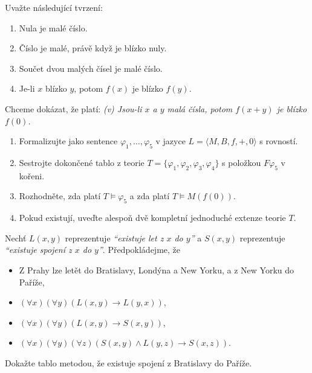 \documentclass[a4paper,12pt]{article}
\begin{document}
\medskip\begin{problem}
Uvažte následující tvrzení:
\begin{enumerate}[label=(\roman*)] \it 
    \item Nula je malé číslo.
    \item Číslo je malé, právě když je blízko nuly.
    \item Součet dvou malých čísel je malé číslo.
    \item Je-li $x$ blízko $y$, potom $f(x)$ je blízko $f(y)$.
\end{enumerate}
Chceme dokázat, že platí: {\it (v) Jsou-li $x$ a $y$ malá čísla, potom $f(x+y)$ je blízko $f(0)$.}

\begin{enumerate}
\item Formalizujte %
jako sentence $\varphi_1,\dots,\varphi_5$ v jazyce $L=\langle M,B,f,+,0\rangle$ s rovností.
\item Sestrojte dokončené tablo z teorie $T=\{\varphi_1,\varphi_2,\varphi_3,\varphi_4\}$ s položkou $F\varphi_5$ v kořeni.
\item Rozhodněte, zda platí $T\models \varphi_5$ a zda platí $T\models M(f(0))$.

\item Pokud existují, uveďte alespoň dvě kompletní jednoduché extenze teorie $T$.
\end{enumerate}
\end{problem}

    
\medskip\begin{problem} Nechť $L(x,y)$ reprezentuje \emph{``existuje let z $x$ do $y$''} a $S(x,y)$ reprezentuje \emph{``existuje spojení z $x$ do $y$''}. Předpokládejme, že
    \begin{itemize}  
    \item Z Prahy lze letět do Bratislavy, Londýna a New Yorku, a z New Yorku do Paříže,
    \item $(\forall x)(\forall y)(L(x,y) \to L(y,x))$,
    \item $(\forall x)(\forall y)(L(x,y)\to S(x,y))$,
    \item $(\forall x)(\forall y)(\forall z)(S(x,y)\wedge L(y,z)\to S(x,z))$.
    \end{itemize}
    Dokažte tablo metodou, že existuje spojení z Bratislavy do Paříže.
\end{problem}
\end{document}
